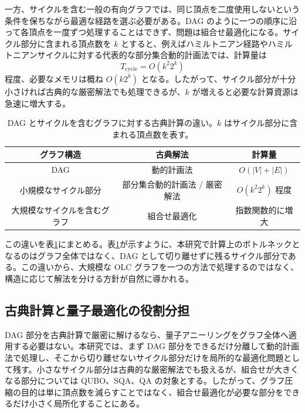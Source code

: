 \documentclass[a4j,10pt]{ujarticle}
\begin{document}
一方、サイクルを含む一般の有向グラフでは、同じ頂点を二度使用しないという条件を保ちながら最適な経路を選ぶ必要がある。DAG のように一つの順序に沿って各頂点を一度ずつ処理することはできず、問題は組合せ最適化になる。サイクル部分に含まれる頂点数を $k$ とすると、例えばハミルトニアン経路やハミルトニアンサイクルに対する代表的な部分集合動的計画法では、計算量は
\[
T_{\mathrm{cycle}}=O(k^2 2^k)
\]
程度、必要なメモリは概ね $O(k2^k)$ となる。したがって、サイクル部分が十分小さければ古典的な厳密解法でも処理できるが、$k$ が増えると必要な計算資源は急速に増大する。



\begin{table}[tbp]
\centering
\begin{tabular}{|c|c|c|}
\hline
\textbf{グラフ構造}
& \textbf{古典解法}
& \textbf{計算量}
\\ \hline

DAG
& 動的計画法
& $O(|V|+|E|)$
\\ \hline

小規模なサイクル部分
& 部分集合動的計画法 / 厳密解法
& $O(k^2 2^k)$ 程度
\\ \hline

大規模なサイクルを含むグラフ
& 組合せ最適化
& 指数関数的に増大
\\ \hline

\end{tabular}

\caption{
DAG とサイクルを含むグラフに対する古典計算の違い。$k$ はサイクル部分に含まれる頂点数を表す。
}
\label{tab:dag_cycle_complexity}
\end{table}

この違いを表\ref{tab:dag_cycle_complexity}にまとめる。表\ref{tab:dag_cycle_complexity}が示すように、本研究で計算上のボトルネックとなるのはグラフ全体ではなく、DAG として切り離せずに残るサイクル部分である。この違いから、大規模な OLC グラフを一つの方法で処理するのではなく、構造に応じて解法を分ける方針が自然に導かれる。


\subsection{古典計算と量子最適化の役割分担}

DAG 部分を古典計算で厳密に解けるなら、量子アニーリングをグラフ全体へ適用する必要はない。本研究では、まず DAG 部分をできるだけ分離して動的計画法で処理し、そこから切り離せないサイクル部分だけを局所的な最適化問題として残す。小さなサイクル部分は古典的な厳密解法でも扱えるが、組合せが大きくなる部分については QUBO、SQA、QA の対象とする。したがって、グラフ圧縮の目的は単に頂点数を減らすことではなく、組合せ最適化が必要な部分をできるだけ小さく局所化することにある。
\end{document}
